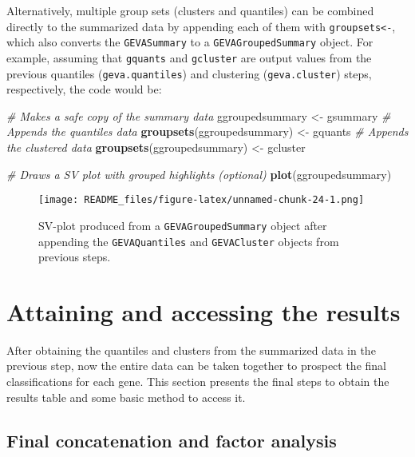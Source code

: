 \documentclass[
  12pt,
]{article}
\newenvironment{Shaded}{\begin{snugshade}}{\end{snugshade}}
\newcommand{\CommentTok}[1]{\textcolor[rgb]{0.56,0.35,0.01}{\textit{#1}}}
\newcommand{\KeywordTok}[1]{\textcolor[rgb]{0.13,0.29,0.53}{\textbf{#1}}}
\newcommand{\NormalTok}[1]{#1}
\newcommand{\StringTok}[1]{\textcolor[rgb]{0.31,0.60,0.02}{#1}}
\begin{document}
Alternatively, multiple group sets (clusters and quantiles) can be
combined directly to the summarized data by appending each of them with
\texttt{groupsets\textless{}-}, which also converts the
\texttt{GEVASummary} to a \texttt{GEVAGroupedSummary} object. For
example, assuming that \texttt{gquants} and \texttt{gcluster} are output
values from the previous quantiles (\texttt{geva.quantiles}) and
clustering (\texttt{geva.cluster}) steps, respectively, the code would
be:

\begin{Shaded}
\begin{Highlighting}[]
\CommentTok{# Makes a safe copy of the summary data}
\NormalTok{ggroupedsummary <-}\StringTok{ }\NormalTok{gsummary}
\CommentTok{# Appends the quantiles data}
\KeywordTok{groupsets}\NormalTok{(ggroupedsummary) <-}\StringTok{ }\NormalTok{gquants}
\CommentTok{# Appends the clustered data}
\KeywordTok{groupsets}\NormalTok{(ggroupedsummary) <-}\StringTok{ }\NormalTok{gcluster}

\CommentTok{# Draws a SV plot with grouped highlights (optional)}
\KeywordTok{plot}\NormalTok{(ggroupedsummary)}
\end{Highlighting}
\end{Shaded}

\begin{figure}
\centering
\texttt{[image: README\_files/figure-latex/unnamed-chunk-24-1.png]}
\caption{SV-plot produced from a \texttt{GEVAGroupedSummary} object
after appending the \texttt{GEVAQuantiles} and \texttt{GEVACluster}
objects from previous steps.}
\end{figure}

\clearpage

\hypertarget{attaining-and-accessing-the-results}{%
\section{Attaining and accessing the
results}\label{attaining-and-accessing-the-results}}

After obtaining the quantiles and clusters from the summarized data in
the previous step, now the entire data can be taken together to prospect
the final classifications for each gene. This section presents the final
steps to obtain the results table and some basic method to access it.

\hypertarget{final-concatenation-and-factor-analysis}{%
\subsection{Final concatenation and factor
analysis}\label{final-concatenation-and-factor-analysis}}
\end{document}
